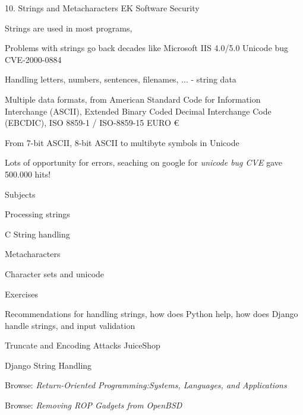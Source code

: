 \documentclass[Screen16to9,17pt]{foils}
\begin{document}
\mytitlepage
{10. Strings and Metacharacters}
{EK  Software Security}



\begin{list1}
\item Strings are used in most programs,
\item Problems with strings go back decades like Microsoft IIS 4.0/5.0 Unicode bug CVE-2000-0884
\item Handling letters, numbers, sentences, filenames, ... - string data
\item Multiple data formats, from American Standard Code for Information Interchange (ASCII), Extended Binary Coded Decimal Interchange Code (EBCDIC), ISO 8859-1 / ISO-8859-15 EURO €
\item From 7-bit ASCII, 8-bit ASCII to multibyte symbols in Unicode
\item Lots of opportunity for errors, seaching on google for \emph{unicode bug CVE} gave 500.000 hits!
\end{list1}


\begin{list1}
\item Subjects
\begin{list2}
\item Processing strings
\item C String handling
\item Metacharacters
\item Character sets and unicode
\end{list2}
\item Exercises
\begin{list2}
\item Recommendations for handling strings, how does Python help, how does Django handle strings, and input validation
\item Truncate and Encoding Attacks JuiceShop
\item Django String Handling
\end{list2}
\end{list1}


\begin{list1}
\item Browse: \emph{Return-Oriented Programming:Systems, Languages, and Applications}
\item Browse: \emph{Removing ROP Gadgets from OpenBSD}
\end{list1}
\end{document}
